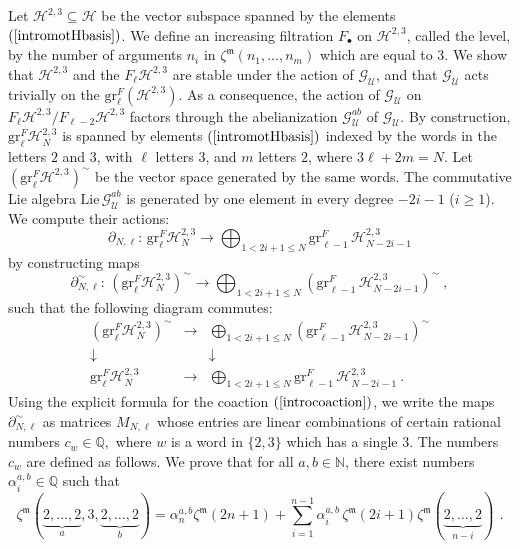 \documentclass[10pt]{amsart}
\theoremstyle{definition}
\theoremstyle{remark}
\numberwithin{equation}{section}
\newcommand{\N}{\mathbb N}
\newcommand{\gr}{\mathrm{gr}}
\newcommand{\Ho}{\mathcal{H}}
\newcommand{\GU}{\mathcal{G}_{\mathcal{U}}}
\newcommand{\zetam}{\zeta^{ \mathfrak{m}}}
\newcommand{\Q}{\mathbb Q}
\newcommand{\To}{\longrightarrow}
\begin{document}
  Let $\Ho^{2,3}\subseteq \Ho$  be the  vector subspace  spanned by the elements $(\ref{intromotHbasis})$. We   define an increasing filtration $F_{\bullet} $ on $\Ho^{2,3}$, called the level, by the number of arguments $n_i$  in   $\zetam(n_1,\ldots, n_m)$  which are equal to $3$.  We show that $\Ho^{2,3}$ and the $F_{\ell} \Ho^{2,3}$ are stable under the action of $\GU$, and that $\GU$ acts trivially on the $\gr^F_{\ell}(\Ho^{2,3})$. As a consequence, the action of $\GU$ on $F_{\ell} \Ho^{2,3} / F_{\ell-2} \Ho^{2,3}$ factors through the abelianization $\GU^{ab}$ of $\GU$.
  By construction, $\gr^F_{\ell} \Ho^{2,3}_N$ is spanned by elements $(\ref{intromotHbasis})$  indexed by the words in the letters $2$ and $3$, with $\ell$ letters $3$, and $m$ letters $2$, where $3\ell + 2 m = N$.  Let $(\gr^F_{\ell} \Ho^{2,3})^{\sim}$ be the vector space generated by the same words.
   The commutative Lie algebra $\mathrm{Lie}\, \GU^{ab}$ is generated by one element in every degree $-2i-1$ ($i\geq 1$). We compute their actions:
 \begin{equation} \label{introDNL} \partial_{N,\ell} :\, \gr^F_\ell \Ho_N^{2,3} \To \bigoplus_{1 <2i+1\leq N}  \gr^F_{\ell-1}\,  \Ho_{N-2i-1}^{2,3} 
\end{equation}
by constructing maps 
 \begin{equation} \label{introDNLformal} \partial^{\sim}_{N,\ell} :\, (\gr^F_\ell \Ho_N^{2,3})^{\sim} \To \bigoplus_{1 <2i+1\leq N}  (\gr^F_{\ell-1}\,  \Ho_{N-2i-1}^{2,3} )^{\sim}\ ,
\end{equation}
such that the following diagram commutes:
$$\begin{array}{ccc}
  (\gr^F_\ell \Ho_N^{2,3})^{\sim}  &   \To  &   \bigoplus_{1 <2i+1\leq N}  (\gr^F_{\ell-1}\,  \Ho_{N-2i-1}^{2,3} )^{\sim} \\
 \downarrow &   &   \downarrow \\
 \gr^F_\ell \Ho_N^{2,3}   &   \To  & \bigoplus_{1 <2i+1\leq N}  \gr^F_{\ell-1}\,  \Ho_{N-2i-1}^{2,3}   \ . 
\end{array}
$$
Using the explicit formula for the coaction $(\ref{introcoaction})$, we write  the maps $\partial^{\sim}_{N,\ell}$ as  matrices $M_{N,\ell}$ whose entries are linear combinations of certain 
rational numbers
$c_w \in \Q,$ 
where $w$  is a  word in  $\{2,3\}$ which has a single  $3.$
The numbers $c_w$ are defined as follows. We prove that for all $a,b\in \N$,  there exist numbers $\alpha^{a,b}_i\in \Q$ such that
\begin{equation} \label{introZagmot}
\zetam(\underbrace{2,\ldots, 2}_{a}, 3,\underbrace{2,\ldots, 2}_{b})= \alpha_n^{a,b} \zetam(2n+1)+  \sum_{i=1}^{n-1} \alpha^{a,b}_i\, \zetam(2i+1)  \zetam(\underbrace{2,\ldots, 2}_{n-i})\,   \ .\end{equation}
\end{document}
